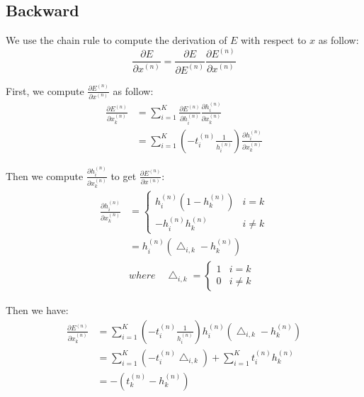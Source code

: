 \documentclass{elegantbook}
\begin{document}
\subsection{Backward}
We use the chain rule to compute the derivation of $E$ with respect to $x$ as follow:
\begin{equation}
\frac{\partial E}{\partial x^{(n)}}=\frac{\partial E}{\partial E^{(n)}}\frac{\partial E^{(n)}}{\partial x^{(n)}}
\end{equation}

First, we compute $\frac{\partial E^{(n)}}{\partial x^{(n)}}$ as follow:
\begin{equation}
\begin{aligned}
\frac{\partial E^{(n)}}{\partial x_k^{(n)}}&=\sum_{i=1}^K\frac{\partial E^{(n)}}{\partial h_i^{(n)}}\frac{\partial h_i^{(n)}}{\partial x_k^{(n)}} \\
&=\sum_{i=1}^K\left(-t_i^{(n)}\frac{1}{h_i^{(n)}}\right)\frac{\partial h_i^{(n)}}{\partial x_k^{(n)}}
\end{aligned}
\end{equation}

Then we compute $\frac{\partial h_i^{(n)}}{\partial x_k^{(n)}}$ to get $\frac{\partial E^{(n)}}{\partial x^{(n)}}$:
\begin{equation}
\begin{aligned}
\frac{\partial h_i^{(n)}}{\partial x_k^{(n)}}&=\left\{
\begin{array}{cc}
h_i^{(n)}(1-h_k^{(n)})& i=k \\
-h_i^{(n)}h_k^{(n)} & i\ne k
\end{array}
\right. \\
&=h_i^{(n)}(\bigtriangleup_{i,k}-h_k^{(n)}) \\
&where\quad \bigtriangleup_{i,k}=\left\{
\begin{array}{cc}
1 & i=k \\
0 & i\ne k
\end{array}
\right.
\end{aligned}
\end{equation}

Then we have:
\begin{equation}
\begin{aligned}
\frac{\partial E^{(n)}}{\partial x_k^{(n)}}&=\sum_{i=1}^K\left(-t_i^{(n)}\frac{1}{h_i^{(n)}}\right)h_i^{(n)}(\bigtriangleup_{i,k}-h_k^{(n)}) \\
&=\sum_{i=1}^K\left(-t_i^{(n)}\bigtriangleup_{i,k}\right)+\sum_{i=1}^Kt_i^{(n)}h_k^{(n)} \\
&=-(t_k^{(n)}-h_k^{(n)})
\end{aligned}
\end{equation}
\end{document}
